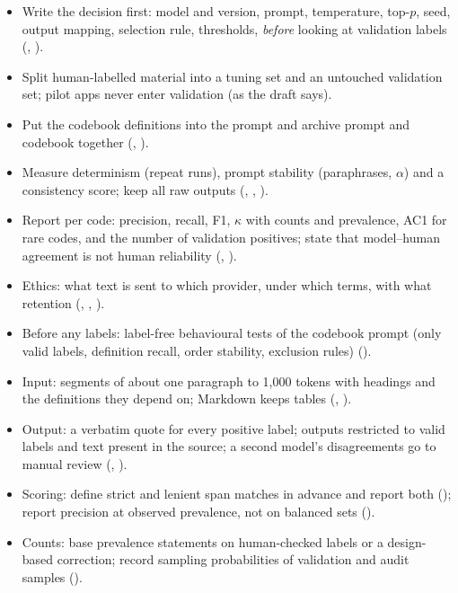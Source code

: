 \begin{protocolbox}
\begin{itemize}[leftmargin=1.3em]
\item Write the decision first: model and version, prompt, temperature, top-$p$, seed, output mapping, selection rule, thresholds, \emph{before} looking at validation labels (, ).
\item Split human-labelled material into a tuning set and an untouched validation set; pilot apps never enter validation (as the draft says).
\item Put the codebook definitions into the prompt and archive prompt and codebook together (, ).
\item Measure determinism (repeat runs), prompt stability (paraphrases, $\alpha$) and a consistency score; keep all raw outputs (, , ).
\item Report per code: precision, recall, F1, $\kappa$ with counts and prevalence, AC1 for rare codes, and the number of validation positives; state that model--human agreement is not human reliability (, ).
\item Ethics: what text is sent to which provider, under which terms, with what retention (, , ).
\item Before any labels: label-free behavioural tests of the codebook prompt (only valid labels, definition recall, order stability, exclusion rules) ().
\item Input: segments of about one paragraph to 1,000 tokens with headings and the definitions they depend on; Markdown keeps tables (, ).
\item Output: a verbatim quote for every positive label; outputs restricted to valid labels and text present in the source; a second model's disagreements go to manual review (, ).
\item Scoring: define strict and lenient span matches in advance and report both (); report precision at observed prevalence, not on balanced sets ().
\item Counts: base prevalence statements on human-checked labels or a design-based correction; record sampling probabilities of validation and audit samples ().
\end{itemize}
\end{protocolbox}

